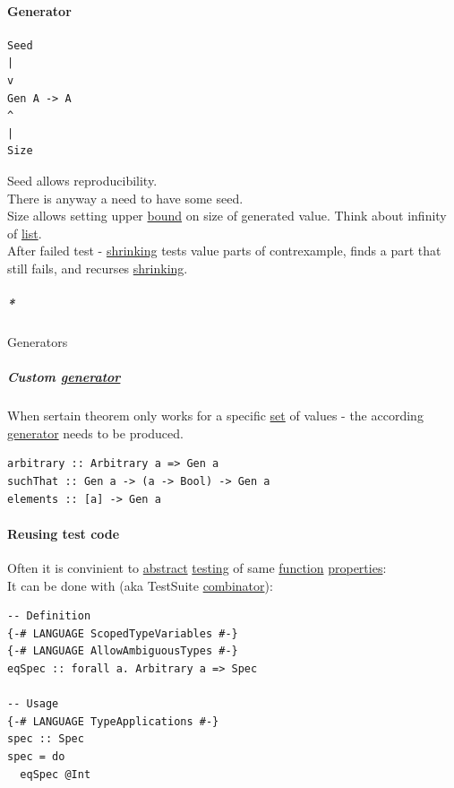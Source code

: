 \documentclass[11pt]{article}
\begin{document}
\paragraph{\label{org1fe413f}Generator}
\label{sec:org2bdbe1f}
\begin{verbatim}
Seed
|
v
Gen A -> A
^
|
Size
\end{verbatim}

Seed allows reproducibility.\\
There is anyway a need to have some seed.\\
Size allows setting upper \hyperref[orgaac83d9]{bound} on size of generated value. Think about infinity of \hyperref[org874a6e0]{list}.\\

After failed test - \hyperref[org75e4286]{shrinking} tests value parts of contrexample, finds a part that still fails, and recurses \hyperref[org75e4286]{shrinking}.\\

\subparagraph{\emph{*}}
\label{sec:org4ada480}

\label{org6e492b5}Generators\\

\subparagraph{Custom \hyperref[org1fe413f]{generator}}
\label{sec:org15a8a29}
When sertain theorem only works for a specific \hyperref[org1faf06d]{set} of values - the according \hyperref[org1fe413f]{generator} needs to be produced.\\

\begin{verbatim}
arbitrary :: Arbitrary a => Gen a
suchThat :: Gen a -> (a -> Bool) -> Gen a
elements :: [a] -> Gen a
\end{verbatim}

\paragraph{\label{orgf6ad2a5}Reusing test code}
\label{sec:org59cc88e}
Often it is convinient to \hyperref[orgbbe9132]{abstract} \hyperref[org8d1ff3f]{testing} of same \hyperref[orge15bc14]{function} \hyperref[org85fb3a1]{properties}:\\

It can be done with (aka TestSuite \hyperref[orgf51e837]{combinator}):\\
\begin{verbatim}
-- Definition
{-# LANGUAGE ScopedTypeVariables #-}
{-# LANGUAGE AllowAmbiguousTypes #-}
eqSpec :: forall a. Arbitrary a => Spec

-- Usage
{-# LANGUAGE TypeApplications #-}
spec :: Spec
spec = do
  eqSpec @Int
\end{verbatim}
\end{document}
